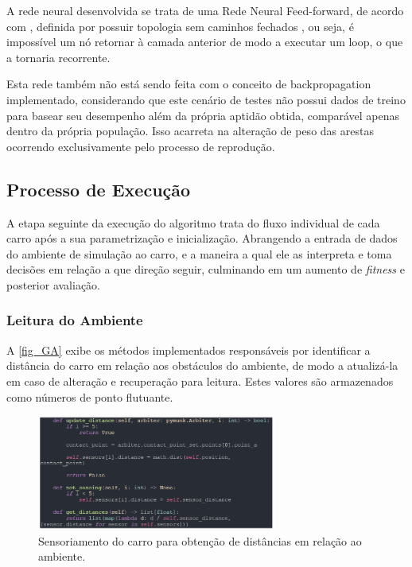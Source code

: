 A rede neural desenvolvida se trata de uma Rede Neural Feed-forward, de acordo com , definida por possuir topologia sem caminhos fechados , ou seja, é impossível um nó retornar à camada anterior de modo a executar um loop, o que a tornaria recorrente. 

Esta rede também não está sendo feita com o conceito de backpropagation implementado, considerando que este cenário de testes não possui dados de treino para basear seu desempenho além da própria aptidão obtida, comparável apenas dentro da própria população. Isso acarreta na alteração de peso das arestas ocorrendo exclusivamente pelo processo de reprodução.

\subsection{Processo de Execução}
A etapa seguinte da execução do algoritmo trata do fluxo individual de cada carro após a sua parametrização e inicialização. Abrangendo a entrada de dados do ambiente de simulação ao carro, e a maneira a qual ele as interpreta e toma decisões em relação a que direção seguir, culminando em um aumento de \textit{fitness} e posterior avaliação.

\subsubsection{Leitura do Ambiente}
A \autoref{fig_GA} exibe os métodos implementados responsáveis por identificar a distância do carro em relação aos obstáculos do ambiente, de modo a atualizá-la em caso de alteração e recuperação para leitura. Estes valores são armazenados como números de ponto flutuante.

\begin{figure}[htb]
        \centering
        \caption{\label{fig_GA}Sensoriamento do carro para obtenção de distâncias em relação ao ambiente.}
        \includegraphics[width=0.7\textwidth]{images/GA.png}
\end{figure}

